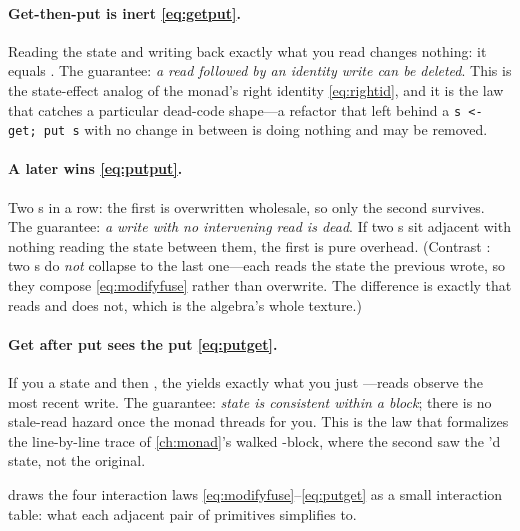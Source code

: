 \paragraph{Get-then-put is inert \eqref{eq:getput}.} Reading the state and writing
back exactly what you read changes nothing: it equals . The
guarantee: \emph{a read followed by an identity write can be deleted}. This is the
state-effect analog of the monad's right identity \eqref{eq:rightid}, and it is the
law that catches a particular dead-code shape---a refactor that left behind a
\lstinline[style=l4style]|s <- get; put s| with no change in between is doing nothing
and may be removed.

\paragraph{A later  wins \eqref{eq:putput}.} Two s in a row: the
first is overwritten wholesale, so only the second survives. The guarantee:
\emph{a write with no intervening read is dead}. If two s sit adjacent with
nothing reading the state between them, the first is pure overhead. (Contrast
: two s do \emph{not} collapse to the last one---each reads
the state the previous wrote, so they compose \eqref{eq:modifyfuse} rather than
overwrite. The difference is exactly that  reads and  does
not, which is the algebra's whole texture.)

\paragraph{Get after put sees the put \eqref{eq:putget}.} If you  a state
and then , the  yields exactly what you just ---reads
observe the most recent write. The guarantee: \emph{state is consistent within a
block}; there is no stale-read hazard once the monad threads for you. This is the law
that formalizes the line-by-line trace of \cref{ch:monad}'s walked -block,
where the second  saw the 'd state, not the original.

 draws the four interaction laws \eqref{eq:modifyfuse}--\eqref{eq:putget}
as a small interaction table: what each adjacent pair of primitives simplifies to.

